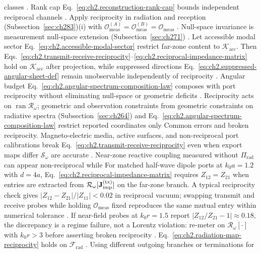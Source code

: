 classes \cite{stratton1941}. Rank cap Eq.~\eqref{eq:ch2.reconstruction-rank-cap} bounds
independent reciprocal channels \cite{harrington2001}.
Apply reciprocity in radiation and reception (Subsection~\ref{sec:ch283})(i) with
\(\mathcal{O}_{\mathrm{meas}}^{(A)}=\mathcal{O}_{\mathrm{meas}}^{(B)}=\mathcal{O}_{\mathrm{meas}}\)
\cite{stratton1941}. Null-space invariance is
measurement null-space extension (Subsection~\ref{sec:ch271}) \cite{stratton1941}. \label{prop:ch2.accessible-sector-reciprocity}
Let accessible modal sector Eq.~\eqref{eq:ch2.accessible-modal-sector} restrict far-zone content
to \(\mathcal{K}_{\mathrm{acc}}\). Then Eqs.~\eqref{eq:ch2.transmit-receive-reciprocity}--\eqref{eq:ch2.reciprocal-impedance-matrix}
hold on \(\mathcal{K}_{\mathrm{acc}}\) after projection, while suppressed directions
Eq.~\eqref{eq:ch2.suppressed-angular-sheet-def} remain unobservable independently of reciprocity
\cite{stratton1941}. Angular budget
Eq.~\eqref{eq:ch2.angular-spectrum-composition-law} composes with port reciprocity without
eliminating null-space or geometric deficits \cite{stratton1941}.
Reciprocity acts on \(\operatorname{ran}\mathcal{R}_\omega\); geometric and observation
constraints from geometric constraints on radiative spectra (Subsection~\ref{sec:ch264}) and
Eq.~\eqref{eq:ch2.angular-spectrum-composition-law} restrict reported coordinates only
Common errors and broken reciprocity. Magneto-electric media, active surfaces, and non-reciprocal port calibrations break
Eq.~\eqref{eq:ch2.transmit-receive-reciprocity} even when export maps differ
\(\mathcal{S}_\omega\) are accurate \cite{stratton1941}. Near-zone reactive
coupling measured without \(\Pi_{\mathrm{rad}}\) can appear non-reciprocal while For matched half-wave dipole ports at $k_0 a=1.2$ with $d=4a$, Eq.~\eqref{eq:ch2.reciprocal-impedance-matrix} requires $Z_{12}=Z_{21}$ when entries are extracted from $\mathcal{R}_\omega[\mathbf{J}_{\mathrm{imp}}^{\mathrm{(tx)}}]$ on the far-zone branch. A typical reciprocity check gives $|Z_{12}-Z_{21}|/|Z_{11}|<0.02$ in reciprocal vacuum; swapping transmit and receive probes while holding $\mathcal{O}_{\mathrm{meas}}$ fixed reproduces the same mutual entry within numerical tolerance \cite{jackson1999}. If near-field probes at $k_0 r=1.5$ report $|Z_{12}/Z_{21}-1|\approx0.18$, the discrepancy is a regime failure, not a Lorentz violation: re-meter on $\mathcal{R}_\omega[\cdot]$ with $k_0 r>3$ before asserting broken reciprocity \cite{harrington2001}. Eq.~\eqref{eq:ch2.radiation-map-reciprocity} holds on \(\mathcal{F}_{\mathrm{rad}}\)
\cite{harrington2001}. Using different outgoing branches or terminations for
